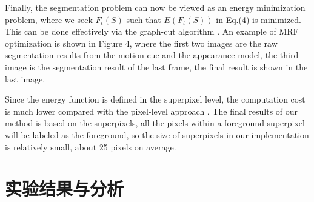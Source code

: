 Finally, the segmentation problem can now be viewed as an energy minimization problem, where we seek $F_{t}(S)$ such that $E(F_{t}(S))$ in Eq.(4) is minimized. This can be done effectively via the graph-cut algorithm \cite{graphcut04}. An example of MRF optimization is shown in Figure 4, where the first two images are the raw segmentation results from the motion cue and the appearance model, the third image is the segmentation result of the last frame, the final result is shown in the last image. \par
Since the energy function is defined in the superpixel level, the computation cost is much lower compared with the pixel-level approach \cite{Multitransform,SubspaceTracking}. The final results of our method is based on the superpixels, all the pixels within a foreground superpixel will be labeled as the foreground, so the size of superpixels in our implementation is relatively small, about 25 pixels on average.

 \section{实验结果与分析}
 \label{ch4:sec:results}
